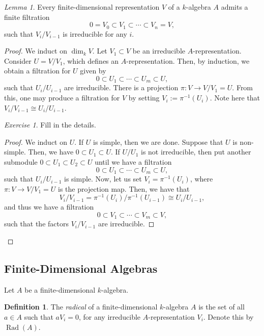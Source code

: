 \documentclass[a4paper]{report}
\theoremstyle{definition}
\newtheorem{definition}{Definition}
\theoremstyle{remark}
\theoremstyle{proposition}
\theoremstyle{conjecture}
\theoremstyle{lemma}
\newtheorem{lemma}{Lemma}
\theoremstyle{corollary}
\theoremstyle{exercise}
\newtheorem{exercise}{Exercise}
\theoremstyle{example}
\newcommand{\on}{\operatorname}
\begin{document}
\begin{lemma}\label{lem14}
    Every finite-dimensional representation $V$ of a $k$-algebra $A$ 
    admits a finite filtration
    $$0 = V_0 \subset V_1 \subset \cdots \subset V_n = V,$$
    such that $V_i/V_{i-1}$ is irreducible for any $i$.
\end{lemma}

\begin{proof}
    We induct on $\dim_kV$. Let $V_1\subset V$ be an irreducible 
    $A$-representation. Consider $U = V/V_1$, which defines an
    $A$-representation. Then, by induction, we obtain a filtration
    for $U$ given by
    $$0\subset U_1 \subset \cdots\subset U_{m}\subset U,$$
    such that $U_i/U_{i-1}$ are irreducible.
    There is a projection $\pi : V \to V/V_1 = U$.
    From this, one may produce a filtration for $V$ 
    by setting $V_i := \pi^{-1}(U_i)$.
    Note here that $V_i/V_{i-1} \cong U_i/U_{i-1}$.
    \begin{exercise} 
        Fill in the details.
    \end{exercise}
    \begin{proof}
        We induct on $U$. If $U$ is simple, then we are done. Suppose that 
        $U$ is non-simple. Then, we have $0\subset U_1 \subset U$. 
        If $U/U_1$ is not irreducible, then put another 
        submodule $0 \subset U_1 \subset U_2 \subset U$ until we have a 
        filtration
        $$0 \subset U_1 \subset \cdots \subset U_m \subset U,$$
        such that $U_i/U_{i-1}$ is simple.
        Now, let us set $V_i = \pi^{-1}(U_i)$, where
        $\pi : V \to V/V_1 = U$ is the projection map. Then, we have 
        that $$V_i/V_{i-1} = \pi^{-1}(U_i)/\pi^{-1}(U_{i-1}) \cong U_i/U_{i-1},$$
        and thus we have a filtration 
        $$0 \subset V_1 \subset \cdots \subset V_m \subset V,$$
        such that the factors $V_i/V_{i-1}$ are irreducible.
    \end{proof}
\end{proof}

\subsection{Finite-Dimensional Algebras}

Let $A$ be a finite-dimensional $k$-algebra.

\begin{definition}
    The \emph{radical} of a finite-dimensional $k$-algebra $A$ is the 
    set of all $a\in A$ such that $aV_i=0$, for any irreducible 
    $A$-representation $V_i$. Denote this by $\on{Rad}(A)$. 
\end{definition}
\end{document}
